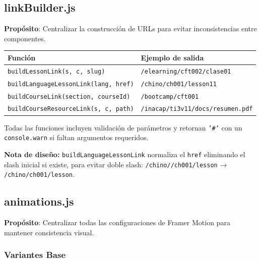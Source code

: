 \documentclass[12pt,a4paper]{article}
\begin{document}
\subsection{linkBuilder.js}

\textbf{Propósito}: Centralizar la construcción de URLs para evitar inconsistencias entre componentes.

\begin{table}[h]
\centering
\begin{tabular}{ll}
\toprule
\textbf{Función} & \textbf{Ejemplo de salida} \\
\midrule
\texttt{buildLessonLink(s, c, slug)} & \texttt{/elearning/cft002/clase01} \\
\texttt{buildLanguageLessonLink(lang, href)} & \texttt{/chino/ch001/lesson11} \\
\texttt{buildCourseLink(section, courseId)} & \texttt{/bootcamp/cft001} \\
\texttt{buildCourseResourceLink(s, c, path)} & \texttt{/inacap/ti3v11/docs/resumen.pdf} \\
\bottomrule
\end{tabular}
\end{table}

Todas las funciones incluyen validación de parámetros y retornan \texttt{'\#'} con un \texttt{console.warn} si faltan argumentos requeridos.

\begin{mdframed}[style=warnbox]
\textbf{Nota de diseño:} \texttt{buildLanguageLessonLink} normaliza el \texttt{href} eliminando el slash inicial si existe, para evitar doble slash: \texttt{/chino//ch001/lesson} → \texttt{/chino/ch001/lesson}.
\end{mdframed}

\subsection{animations.js}

\textbf{Propósito}: Centralizar todas las configuraciones de Framer Motion para mantener consistencia visual.

\subsubsection{Variantes Base}
\end{document}
